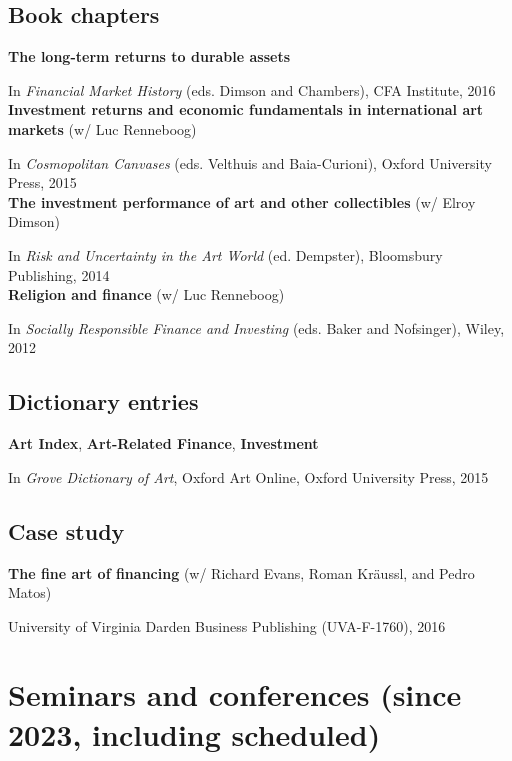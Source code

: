 \documentclass[a4paper]{article}
\begin{document}
\subsection*{Book chapters}

\textbf{The long-term returns to durable assets} 

In \textit{Financial Market History} (eds. Dimson and Chambers), CFA Institute, 2016\\

\textbf{Investment returns and economic fundamentals in international art markets} (w/ Luc Renneboog)

In \textit{Cosmopolitan Canvases} (eds. Velthuis and Baia-Curioni), Oxford University Press, 2015\\

\textbf{The investment performance of art and other collectibles} (w/ Elroy Dimson)

In \textit{Risk and Uncertainty in the Art World} (ed. Dempster), Bloomsbury Publishing, 2014\\

\textbf{Religion and finance} (w/ Luc Renneboog)

In \textit{Socially Responsible Finance and Investing} (eds.
Baker and Nofsinger), Wiley, 2012

\subsection*{Dictionary entries}

\textbf{Art Index}, \textbf{Art-Related Finance}, \textbf{Investment}

In \textit{Grove Dictionary of Art}, Oxford Art Online, Oxford University Press, 2015

\subsection*{Case study}

\textbf{The fine art of financing} (w/ Richard Evans, Roman Kr\"aussl, and Pedro Matos)

University of Virginia Darden Business Publishing (UVA-F-1760), 2016



\section*{Seminars and conferences \normalsize{(since 2023, including scheduled)}}
\end{document}
